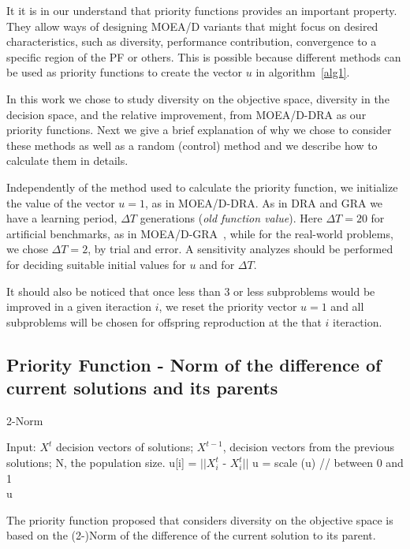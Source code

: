 It it is  in our understand that priority functions provides an important property. They allow ways of designing MOEA/D variants that might focus on desired characteristics, such as diversity, performance contribution, convergence to a specific region of the PF or others. This is possible because different methods can be used as priority functions to create the vector $u$ in algorithm~\ref{alg1}. 

In this work we chose to study diversity on the objective space, diversity in the decision space, and the relative improvement, from MOEA/D-DRA as our priority functions. Next we give a brief explanation of why we chose to consider these methods as well as a random (control) method and we describe how to calculate them in details.

Independently of the method used to calculate the priority function, we initialize the value of the vector $u=1$, as in MOEA/D-DRA. As in DRA and GRA we have a learning period, $\Delta T$ generations (\textit{old function value}). Here $\Delta T=20$ for artificial benchmarks, as in MOEA/D-GRA~\cite{zhou2016all}, while for the real-world problems, we chose $\Delta T=2$, by trial and error. A sensitivity analyzes should be performed for deciding suitable initial values for $u$ and for $\Delta T$.

 It should also be noticed that once less than $3$ or less subproblems would be improved in a given iteraction $i$, we reset the priority vector $u = 1$  and all subproblems will be chosen for offspring reproduction at the that $i$ iteraction.

\subsection{Priority Function - Norm of the difference of current solutions and its parents} 

\begin{algorithm}[t]
	\caption{2-Norm}\label{alg3}
	\begin{algorithmic}[1]
		
		\State Input: $X^{t}$ decision vectors of solutions; $X^{t-1}$, decision vectors from the previous solutions; N, the population size.
			\State u[i] = $||X^{t}_i$ - $X^{t}_i||$
		\EndFor
		\State u = scale (u) // between 0 and 1\\
	\Return u
	\end{algorithmic}
\end{algorithm}

The priority function proposed that considers diversity on the objective space is based on the (2-)Norm of the difference of the current solution to its parent.

